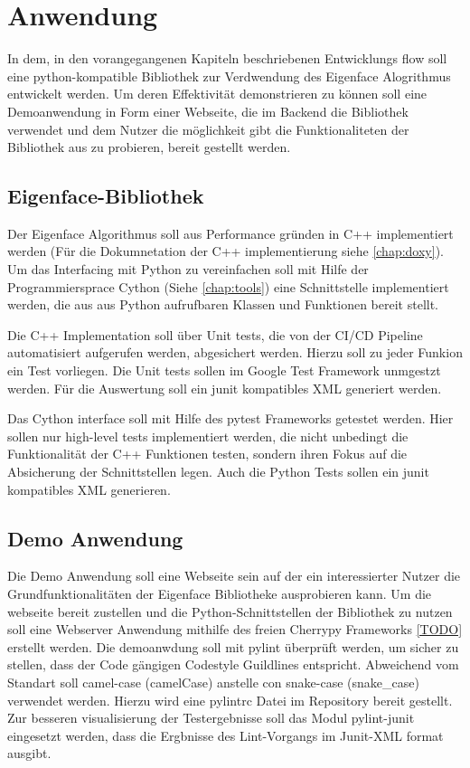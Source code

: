 \chapter{Anwendung}

In dem, in den vorangegangenen Kapiteln beschriebenen Entwicklungs flow soll eine python-kompatible Bibliothek zur Verdwendung des Eigenface Alogrithmus entwickelt werden. Um deren Effektivität demonstrieren zu können soll eine Demoanwendung in Form einer Webseite, die im Backend die Bibliothek verwendet und dem Nutzer die möglichkeit gibt die Funktionaliteten der Bibliothek aus zu probieren, bereit gestellt werden.

\section{Eigenface-Bibliothek}

Der Eigenface Algorithmus soll aus Performance gründen in C++ implementiert werden (Für die Dokumnetation der C++ implementierung siehe \autoref{chap:doxy}). Um das Interfacing mit Python zu vereinfachen soll mit Hilfe der Programmiersprace Cython (Siehe \autoref{chap:tools}) eine Schnittstelle implementiert werden, die aus aus Python aufrufbaren Klassen und Funktionen bereit stellt.

Die C++ Implementation soll über Unit tests, die von der CI/CD Pipeline automatisiert aufgerufen werden, abgesichert werden. Hierzu soll zu jeder Funkion ein Test vorliegen. Die Unit tests sollen im Google Test Framework unmgestzt werden. Für die Auswertung soll ein junit kompatibles XML generiert werden.

Das Cython interface soll mit Hilfe des pytest Frameworks getestet werden. Hier sollen nur high-level tests implementiert werden, die nicht unbedingt die Funktionalität der C++ Funktionen testen, sondern ihren Fokus auf die Absicherung der Schnittstellen legen. Auch die Python Tests sollen ein junit kompatibles XML generieren.

\section {Demo Anwendung}

Die Demo Anwendung soll eine Webseite sein auf der ein interessierter Nutzer die Grundfunktionalitäten der Eigenface Bibliotheke ausprobieren kann. Um die webseite bereit zustellen und die Python-Schnittstellen der Bibliothek zu nutzen soll eine Webserver Anwendung mithilfe des freien Cherrypy Frameworks \ref{TODO} erstellt werden.
Die demoanwdung soll mit pylint überprüft werden, um sicher zu stellen, dass der Code gängigen Codestyle Guildlines entspricht. Abweichend vom Standart soll camel-case (camelCase) anstelle con snake-case (snake\_case) verwendet werden. Hierzu wird eine pylintrc Datei im Repository bereit gestellt. Zur besseren visualisierung der Testergebnisse soll das Modul pylint-junit eingesetzt werden, dass die Ergbnisse des Lint-Vorgangs im Junit-XML format ausgibt.
